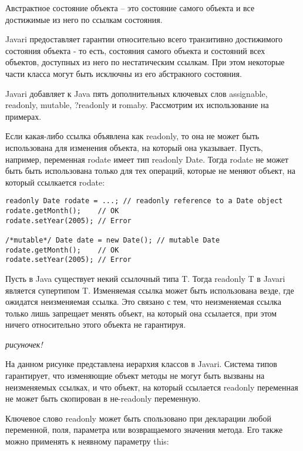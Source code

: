 \begin{Def}\label{abstract_state}
Австрактное состояние объекта -- это состояние самого объекта и все достижимые из него по ссылкам состояния.
\end{Def}

Javari предоставляет гарантии относительно всего транзитивно достижимого состояния объекта - то есть, состояния самого объекта и состояний всех объектов, доступных из него по нестатическим ссылкам. При этом некоторые части класса могут быть исключны из его абстракного состояния. 

Javari добавляет к Java пять дополнительных ключевых слов assignable, readonly, mutable, ?readonly и romaby. Рассмотрим их использование на примерах.

Если какая-либо ссылка объявлена как readonly, то она не может быть использована для изменения объекта, на который она указывает. Пусть, например, переменная rodate имеет тип readonly Date. Тогда rodate не может быть быть использована только для тех операций, которые не меняют объект, на который ссылкается rodate:

\begin{lstlisting}[caption=Неизменяемая ссылка, label=code:readonly_ref]
readonly Date rodate = ...; // readonly reference to a Date object 
rodate.getMonth();    // OK
rodate.setYear(2005); // Error

/*mutable*/ Date date = new Date(); // mutable Date
rodate.getMonth();    // OK
rodate.setYear(2005); // Error
\end{lstlisting}

Пусть в Java существует некий ссылочный типа T. Тогда readonly T в Javari является супертипом T. Изменяемая ссылка может быть использована везде, где ожидатся неизменяемая ссылка. Это связано с тем, что неизменяемая ссылка только лишь запрещает менять объект, на который она ссылается, при этом ничего относительно этого объекта не гарантируя. 

\textit{рисуночек!}

На данном рисунке представлена иерархия классов в Javari. Система типов гарантирует, что изменяющие объект методы не могут быть вызваны на неизменяемых ссылках, и что объект, на который ссылается readonly переменная не может быть скопирован в не-readonly переменную.

Ключевое слово readonly может быть спользовано при декларации любой переменной, поля, параметра или возвращаемого значения метода. Его также можно применять к неявному параметру this:

